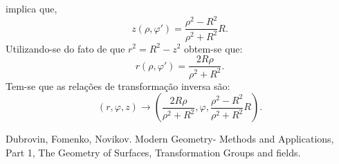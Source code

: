 %
implica que, 
%
\begin{equation}
z(\rho,\varphi') = \frac{\rho^2 - R^2}{\rho^2 + R^2}R.
\end{equation}
%
Utilizando-se do fato de que $r^2 = R^2 - z^2$ 
obtem-se que:
%
\begin{equation}
r(\rho,\varphi') = \frac{2R\rho}{\rho^2 + R^2}.
\end{equation}
%
Tem-se que as relações de transformação inversa são:
%
\begin{equation}
(r,\varphi,z) \to \left(\frac{2R\rho}{\rho^2 + R^2}, 
\varphi, \frac{\rho^2 - R^2}{\rho^2 + R^2}R\right).
\end{equation}
%


\begin{thebibliography}{}

Dubrovin, Fomenko, Novikov. Modern Geometry- Methods and Applications, 
Part 1, The Geometry of Surfaces, Transformation Groups and fields.

\end{thebibliography}